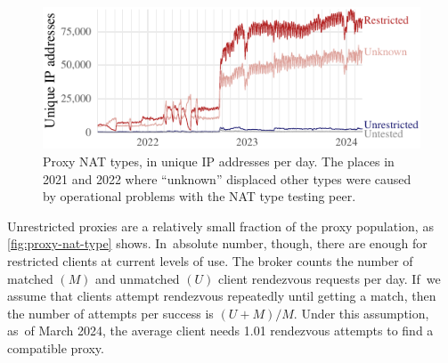 \documentclass[letterpaper,twocolumn]{article}
\begin{document}
\begin{figure}
\includegraphics{figures/proxies/proxy-nat-type}
\caption{
Proxy NAT types, in unique IP addresses per day.
The places in 2021 and 2022
where ``unknown'' displaced other types
were caused by operational problems with
the NAT type testing peer.
}
\label{fig:proxy-nat-type}
\end{figure}

Unrestricted proxies are
a relatively small fraction of the proxy population,
as \autoref{fig:proxy-nat-type} shows.
In~absolute number, though, there are enough
for restricted clients at current levels of use.
The broker counts the number of matched \((M)\)
and unmatched \((U)\) client rendezvous requests per day.
If~we assume that clients attempt rendezvous repeatedly until getting a match,
then the number of attempts per success is \((U + M) / M\).
Under this assumption, as~of March 2024,
the average client needs 1.01 rendezvous attempts
to find a compatible proxy.
\end{document}
